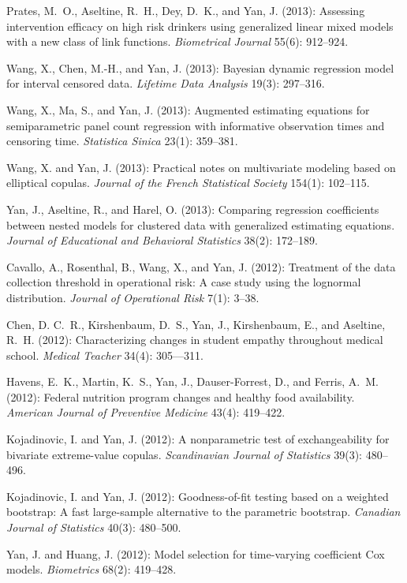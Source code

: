 \documentclass[Statistics]{vita}
\begin{document}
\begin{vita}
\begin{Publications}
\begin{RefereedJournalArticles}
  \item *Prates, M.~O., Aseltine, R.~H., Dey, D.~K., and Yan, J. (2013): Assessing intervention efficacy on high risk drinkers using generalized linear mixed models with a new class of link functions. {\em Biometrical Journal\/} 55(6): 912--924.
  \item *Wang, X., Chen, M.-H., and Yan, J. (2013): Bayesian dynamic regression model for interval censored data. {\em Lifetime Data Analysis\/} 19(3): 297--316.
  \item *Wang, X., Ma, S., and Yan, J. (2013): Augmented estimating equations for semiparametric panel count regression with informative observation times and censoring time. {\em Statistica Sinica\/} 23(1): 359--381.
  \item *Wang, X. and Yan, J. (2013): Practical notes on multivariate modeling based on elliptical copulas. {\em Journal of the French Statistical Society\/} 154(1): 102--115.
  \item Yan, J., Aseltine, R., and Harel, O. (2013): Comparing regression coefficients between nested models for clustered data with generalized estimating equations. {\em Journal of Educational and Behavioral Statistics\/} 38(2): 172--189.
  \item Cavallo, A., Rosenthal, B., Wang, X., and Yan, J. (2012): Treatment of the data collection threshold in operational risk: {A} case study using the lognormal distribution. {\em Journal of Operational Risk\/} 7(1): 3--38.
  \item Chen, D. C.~R., Kirshenbaum, D.~S., Yan, J., Kirshenbaum, E., and Aseltine,  R.~H. (2012): Characterizing changes in student empathy throughout medical school. {\em Medical Teacher\/} 34(4): 305--–311.
  \item Havens, E.~K., Martin, K.~S., Yan, J., Dauser-Forrest, D., and Ferris, A.~M. (2012): Federal nutrition program changes and healthy food availability. {\em  American Journal of Preventive Medicine\/} 43(4): 419--422.
  \item Kojadinovic, I. and Yan, J. (2012): A nonparametric test of exchangeability for bivariate extreme-value copulas. {\em Scandinavian Journal of Statistics\/} 39(3): 480--496.
  \item Kojadinovic, I. and Yan, J. (2012): Goodness-of-fit testing based on a weighted bootstrap: A fast large-sample alternative to the parametric bootstrap. {\em Canadian Journal of Statistics\/} 40(3): 480--500.
  \item Yan, J. and Huang, J. (2012): Model selection for time-varying coefficient Cox models. {\em Biometrics\/} 68(2): 419--428.

\end{RefereedJournalArticles}
\end{Publications}
\end{vita}
\end{document}
